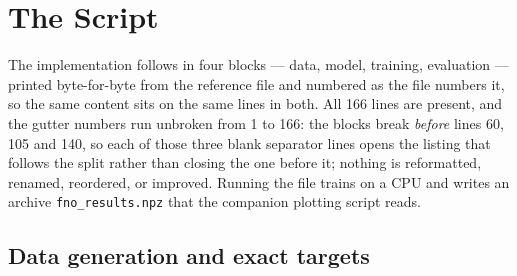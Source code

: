 \section{The Script}
\label{sec:appb-code}

The implementation follows in four blocks --- data, model, training, evaluation ---
printed byte-for-byte from the reference file and numbered as the file numbers it, so
the same content sits on the same lines in both. All 166 lines are present, and the
gutter numbers run unbroken from 1 to 166: the blocks break \emph{before} lines 60,
105 and 140, so each of those three blank separator lines opens the listing that
follows the split rather than closing the one before it; nothing is reformatted,
renamed, reordered, or improved.
Running the file trains on a CPU and writes an archive \texttt{fno\_results.npz} that
the companion plotting script reads.

\subsection{Data generation and exact targets}

